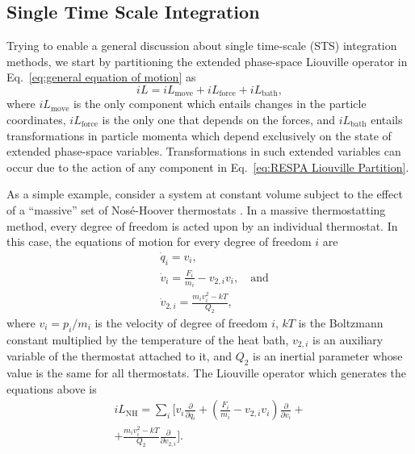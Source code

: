 \documentclass[
    journal=jctcce,
    layout=twocolumn
]{achemso}
\newcommand{\diff}[2]{\frac{\partial #2}{\partial #1}} %
\newcommand{\dof}{i}   %
\newcommand{\Liu}{i\!L}
\begin{document}
\subsection{Single Time Scale Integration}

Trying to enable a general discussion about single time-scale (STS) integration methods, we start by partitioning the extended phase-space Liouville operator in Eq.~\eqref{eq:general equation of motion} as
\begin{equation}
\label{eq:STS Liouville Partition}
\Liu = \Liu_\mathrm{move} + \Liu_\mathrm{force} + \Liu_\mathrm{bath},
\end{equation}
where $\Liu_\mathrm{move}$ is the only component which entails changes in the particle coordinates,
$\Liu_\mathrm{force}$ is the only one that depends on the forces, and
$\Liu_\mathrm{bath}$ entails transformations in particle momenta which depend exclusively on the state of extended phase-space variables.
Transformations in such extended variables can occur due to the action of any component in Eq.~\eqref{eq:RESPA Liouville Partition}.

As a simple example, consider a system at constant volume subject to the effect of a ``massive'' set of Nos\'e-Hoover thermostats \cite{Tuckerman_2010}.
In a massive thermostatting method, every degree of freedom is acted upon by an individual thermostat.
In this case, the equations of motion for every degree of freedom $\dof$ are
\begin{subequations}
	\label{eq:NH equations of motion}
	\begin{align}
	& \dot{q}_\dof = v_\dof, \label{eq:NH q} \\
	& \dot{v}_\dof = \frac{F_\dof}{m_\dof} - v_{2,\dof} v_\dof, \quad \mathrm{and} \label{eq:NH v}  \\
	& \dot{v}_{2,\dof} = \tfrac{m_\dof v_\dof^2 - kT}{Q_2}, \label{eq:NH v2}
	\end{align}
\end{subequations}
where $v_\dof = p_\dof/m_\dof$ is the velocity of degree of freedom $\dof$,
$kT$ is the Boltzmann constant multiplied by the temperature of the heat bath,
$v_{2,\dof}$ is an auxiliary variable of the thermostat attached to it, and
$Q_2$ is an inertial parameter whose value is the same for all thermostats.
The Liouville operator which generates the equations above is
\begin{multline}
\label{eq:NH Liouville operator}
\Liu_\mathrm{NH} = \sum_\dof \bigg[ v_\dof \diff{q_\dof}{} + \left(\frac{F_\dof}{m_\dof} - v_{2,\dof} v_\dof \right) \diff{v_\dof}{} + \\
+ \frac{m_\dof v_\dof^2 - kT}{Q_2} \diff{v_{2,\dof}}{} \bigg].
\end{multline}
\end{document}
